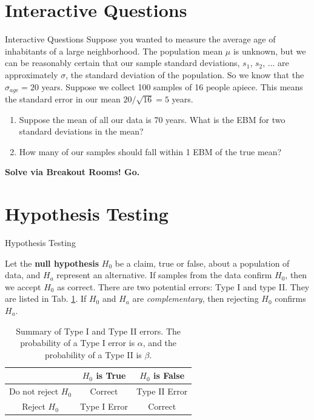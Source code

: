 \documentclass{beamer}
\begin{document}
\section{Interactive Questions}

\begin{frame}{Interactive Questions}
Suppose you wanted to measure the average age of inhabitants of a large neighborhood.  The population mean $\mu$ is unknown, but we can be reasonably certain that our sample standard deviations, $s_1$, $s_2$, ... are approximately $\sigma$, the standard deviation of the population.  So we know that the $\sigma_{age} = 20$ years.  Suppose we collect 100 samples of 16 people apiece.  This means the standard error in our mean $20/\sqrt{16} = 5$ years. \\
\begin{enumerate}
\item Suppose the mean of all our data is 70 years.  What is the EBM for two standard deviations in the mean?
\item How many of our samples should fall within 1 EBM of the true mean?
\end{enumerate}
\textbf{\alert{Solve via Breakout Rooms!  Go.}}
\end{frame}

\section{Hypothesis Testing}

\begin{frame}{Hypothesis Testing}
\begin{tcolorbox}[colback=orange!10,colframe=orange!100,title=The Null Hypothesis and Type I and II Errors]
Let the \textbf{null hypothesis} $H_0$ be a claim, true or false, about a population of data, and $H_a$ represent an alternative.  If samples from the data confirm $H_0$, then we accept $H_0$ as correct.  There are two potential errors: Type I and type II.  They are listed in Tab. \ref{tab:err}.  If $H_0$ and $H_a$ are \textit{complementary}, then rejecting $H_0$ confirms $H_a$.
\end{tcolorbox}
\begin{table}
\begin{tabular}{| c | c | c |}
\hline
& $H_0$ is True & $H_0$ is False \\ \hline
Do not reject $H_0$ & Correct & Type II Error \\ \hline
Reject $H_0$ & Type I Error & Correct \\ \hline
\end{tabular}
\caption{\label{tab:err} Summary of Type I and Type II errors.  The probability of a Type I error is $\alpha$, and the probability of a Type II is $\beta$.}
\end{table}
\end{frame}
\end{document}
